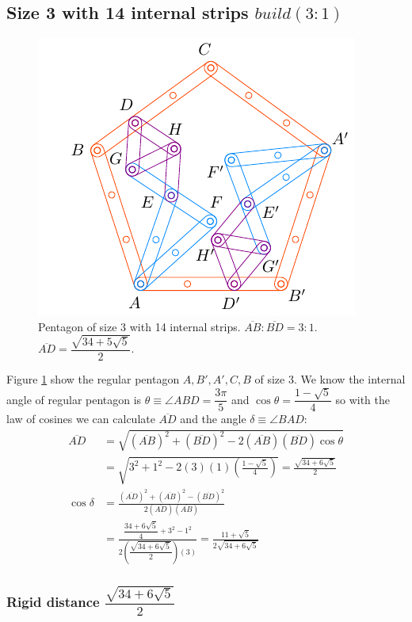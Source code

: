 \documentclass[11pt]{article}
\begin{document}
\subsection{Size 3 with 14 internal strips $build(3:1)$}

\begin{figure}[h]
\centering
\includegraphics[scale=1.2]{3/penta3-14a}
\caption{Pentagon of size 3 with 14 internal strips. $\overline{AB}:\overline{BD} = 3:1$. $\overline{AD} = \dfrac{\sqrt{34+5\sqrt5}}2$.}
\label{fig:penta3-14a}
\end{figure}

Figure \ref{fig:penta3-14a} show the regular pentagon $A,B',A',C,B$ of size $3$. We know the internal angle of regular pentagon is $\theta \equiv \angle{ABD} = \dfrac{3\pi}5$ and $\cos\theta=\dfrac{1-\sqrt5}4$ so with the law of cosines we can calculate $\overline{AD}$ and the angle $\delta \equiv \angle{BAD}$:
\begin{align}
\overline{AD} &= \sqrt{(\overline{AB})^2 + (\overline{BD})^2
 - 2(\overline{AB})(\overline{BD})\cos\theta} \nonumber\\
 &= \sqrt{3^2 + 1^2 - 2(3)(1)\left(\frac{1-\sqrt5}4\right)} = \frac{\sqrt{34+6\sqrt5}}2\\
\cos\delta &= \frac{(\overline{AD})^2 + (\overline{AB})^2 - (\overline{BD})^2}
 {2(\overline{AD})(\overline{AB})} \nonumber\\
 &= \frac{\dfrac{34+6\sqrt5}4 + 3^2 - 1^2}{2\left(\dfrac{\sqrt{34+6\sqrt5}}2\right)(3)}
  = \frac{11+\sqrt5}{2\sqrt{34+6\sqrt5}}
\end{align}

\subsubsection{Rigid distance  $\dfrac{\sqrt{34+6\sqrt5}}2$}
\end{document}
